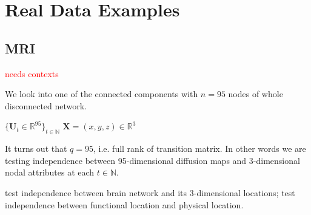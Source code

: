\documentclass[12pt]{article}
\theoremstyle{definition}
\begin{document}
\section{Real Data Examples}
\label{sec:real}
	
\subsection{MRI}
	
\textcolor{red}{needs contexts}	
	
We look into one of the connected components with $n = 95$ nodes of whole disconnected network. 
	
$\{ \mathbf{U}_{t} \in \mathbb{R}^{95} \}_{t \in \mathbb{N}}$ $\mathbf{X} = (x,y,z) \in \mathbb{R}^{3}$
	
It turns out that $q=95$, i.e. full rank of transition matrix. In other words we are testing independence between 95-dimensional diffusion maps and 3-dimensional nodal attributes at each $t \in \mathbb{N}$.
	
	
test independence between brain network and its 3-dimensional locations; test independence between functional location and physical location. 
	
\end{document}
